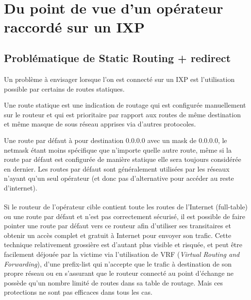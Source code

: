 \section{Du point de vue d'un opérateur raccordé sur un IXP}

\subsection{Problématique de Static Routing + redirect}
\paragraph{}
Un problème à envisager lorsque l'on est connecté sur un IXP est l’utilisation possible par certains de routes statiques. 

Une route statique est une indication de routage qui est configurée manuellement sur le routeur et qui est prioritaire par rapport aux routes de même destination et même masque de sous réseau apprises via d'autres protocoles.

Une route par défaut à pour destination 0.0.0.0 avec un mask de 0.0.0.0, le netmask étant moins spécifique que n'importe quelle autre route, même si la route par défaut est configurée de manière statique elle sera toujours considérée en dernier. Les routes par défaut sont généralement utilisées par les réseaux n'ayant qu'un seul opérateur (et donc pas d'alternative pour accéder au reste d'internet).

\paragraph{}
Si le routeur de l'opérateur cible contient toute les routes de l'Internet (full-table) ou une route par défaut et n'est pas correctement sécurisé, il est possible de faire pointer une route par défaut vers ce routeur afin d’utiliser ses transitaires et obtenir un accès complet et gratuit à Internet pour envoyer son trafic. Cette technique relativement grossière est d'autant plus visible et risquée, et peut être facilement déjouée par la victime via l'utilisation de VRF (\emph{Virtual Routing and Forwarding}), d'une prefix-list qui n'accepte que le trafic à destination de son propre réseau ou en s'assurant que le routeur connecté au point d'échange ne possède qu'un nombre limité de routes dans sa table de routage. Mais ces protections ne sont pas efficaces dans tous les cas.

